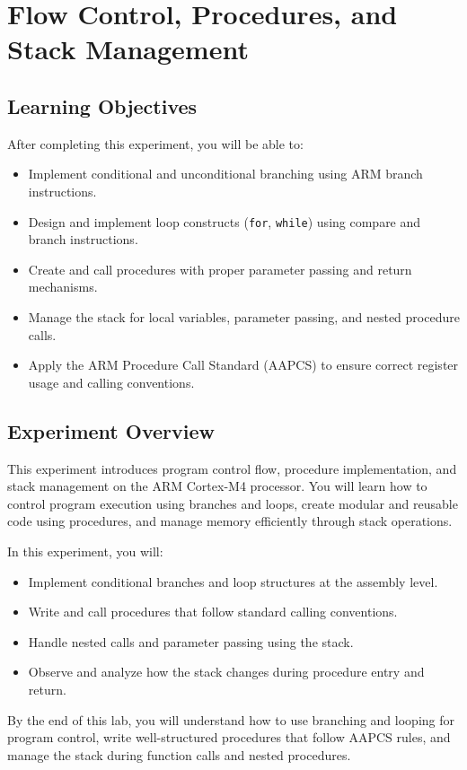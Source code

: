 \chapter{Flow Control, Procedures, and Stack Management}

\section*{Learning Objectives}
After completing this experiment, you will be able to:
\begin{itemize}[nosep]
  \item Implement conditional and unconditional branching using ARM branch instructions.
  \item Design and implement loop constructs (\texttt{for}, \texttt{while}) using compare and branch instructions.
  \item Create and call procedures with proper parameter passing and return mechanisms.
  \item Manage the stack for local variables, parameter passing, and nested procedure calls.
  \item Apply the ARM Procedure Call Standard (AAPCS) to ensure correct register usage and calling conventions.
\end{itemize}

\section*{Experiment Overview}
This experiment introduces program control flow, procedure implementation, and stack management on the ARM Cortex-M4 processor. 
You will learn how to control program execution using branches and loops, create modular and reusable code using procedures, and manage memory efficiently through stack operations.

\noindent In this experiment, you will:
\begin{itemize}[nosep]
  \item Implement conditional branches and loop structures at the assembly level.
  \item Write and call procedures that follow standard calling conventions.
  \item Handle nested calls and parameter passing using the stack.
  \item Observe and analyze how the stack changes during procedure entry and return.
\end{itemize}

By the end of this lab, you will understand how to use branching and looping for program control, write well-structured procedures that follow AAPCS rules, and manage the stack during function calls and nested procedures.


